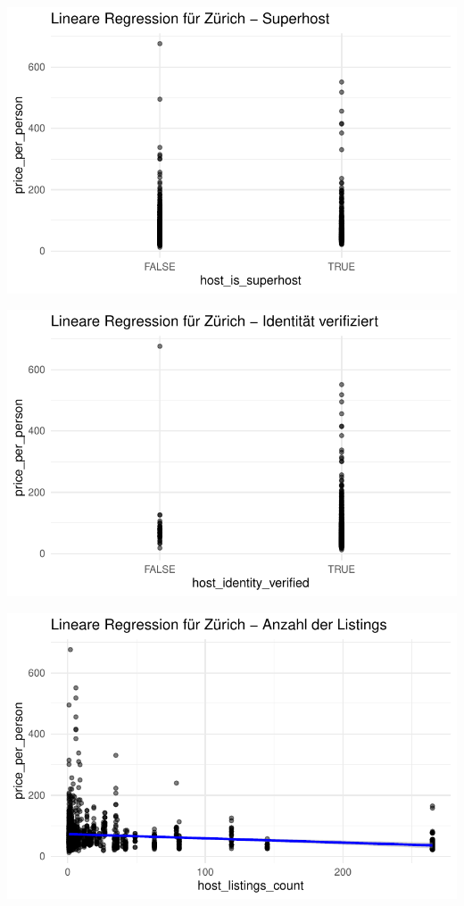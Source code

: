 \documentclass[
  journal,
]{IEEEtran}%
\begin{document}
\includegraphics{main_files/figure-pdf/unnamed-chunk-14-4.pdf}

\includegraphics{main_files/figure-pdf/unnamed-chunk-14-5.pdf}

\includegraphics{main_files/figure-pdf/unnamed-chunk-14-6.pdf}
\end{document}
